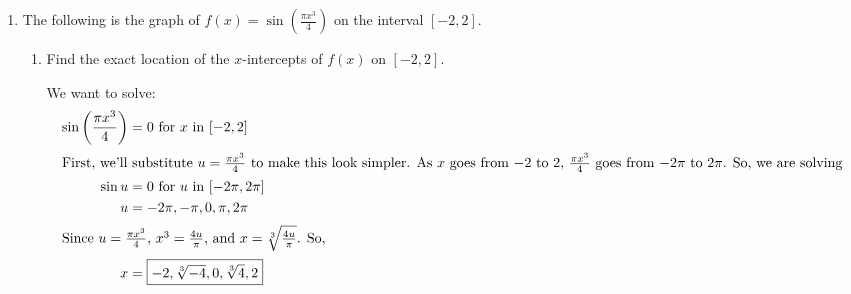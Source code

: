 \documentclass{article}
\begin{document}
\begin{enumerate}
\begin{enumerate}

  \end{enumerate}

  \probonly{\newpage}

\item \label{spring2009-xb-midterm2-4-modified}

  The following is the graph of $\displaystyle f(x) = \sin \left(
    \frac{\pi x^3}{4} \right)$ on the interval $[-2, 2].$

  \begin{center}
  \end{center}

  \begin{enumerate}
  \item
    \begin{problem}[\vfill]
      Find the exact location of the $x$-intercepts of $f(x)$ on $[-2, 2]$.
    \end{problem}

    \begin{solution}
      We want to solve: 
      \begin{align*}
        \sin \left( \frac{\pi x^3}{4} \right) &= 0 \text{ for $x$ in }
        [-2, 2] \\
        \intertext{First, we'll substitute $u = \frac{\pi x^3}{4}$ to make
          this look simpler.  As $x$ goes from $-2$ to $2$, $\frac{\pi
            x^3}{4}$ goes from $-2 \pi$ to $2 \pi$. So, we are solving}
        \sin u &= 0 \text{ for $u$ in $[-2 \pi, 2 \pi]$} \\
        u &= - 2\pi, - \pi, 0, \pi, 2 \pi \\
        \intertext{Since $u = \frac{\pi x^3}{4}$, $x^3 = \frac{4u}{\pi}$,
          and $x = \sqrt[3]{\frac{4u}{\pi}}$.  So,} %
        x &= \boxed{-2, \sqrt[3]{-4}, 0, \sqrt[3]{4}, 2}
      \end{align*}


\end{solution}
\end{enumerate}
\end{enumerate}
\end{document}
